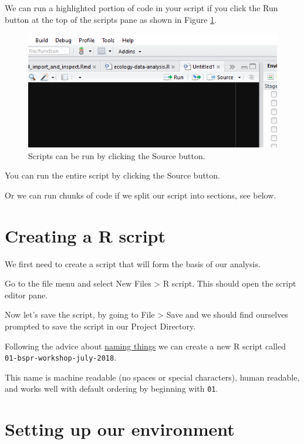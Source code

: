 \documentclass[12pt,]{book}
\theoremstyle{definition}
\theoremstyle{definition}
\theoremstyle{definition}
\theoremstyle{remark}
\begin{document}
We can run a highlighted portion of code in your script if you click the
Run button at the top of the scripts pane as shown in Figure
\ref{fig:run-script}.



\begin{figure}

{\centering \includegraphics[width=0.8\linewidth]{img/run_script} 

}

\caption{Scripts can be run by clicking the Source button.}\label{fig:run-script}
\end{figure}

You can run the entire script by clicking the Source button.

Or we can run chunks of code if we split our script into sections, see
below.

\section{Creating a R script}\label{creating-a-r-script}

We first need to create a script that will form the basis of our
analysis.

Go to the file menu and select New Files \textgreater{} R script. This
should open the script editor pane.

Now let's save the script, by going to File \textgreater{} Save and we
should find ourselves prompted to save the script in our Project
Directory.

Following the advice about \protect\hyperlink{names}{naming things} we
can create a new R script called \texttt{01-bspr-workshop-july-2018}.

This name is machine readable (no spaces or special characters), human
readable, and works well with default ordering by beginning with
\texttt{01}.

\section{Setting up our environment}\label{setting-up-our-environment}
\end{document}
